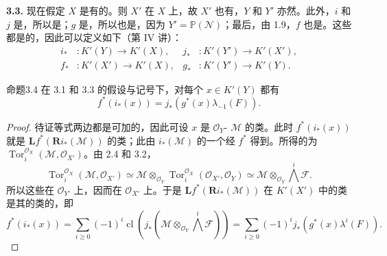 \textbf{3.3.} 现在假定 $X$ 是有的。则 $X'$ 在 $X$ 上，故 $X'$ 也有，$Y$ 和 $Y'$ 亦然。此外，$i$ 和 $j$ 是，所以是；$g$ 是，所以也是，因为 $Y'=\mathbb P(\mathcal N)$；最后，由 1.9，$f$ 也是。这些都是的，因此可以定义如下（第 IV 讲）：
\[
\begin{aligned}
i_* &:K'(Y)\longrightarrow K'(X),&j_* &:K'(Y')\longrightarrow K'(X'),\\
f_* &:K'(X')\longrightarrow K'(X),&g_* &:K'(Y')\longrightarrow K'(Y).
\end{aligned}
\]
\begin{SGAresult}{命题}{3.4}
在 3.1 和 3.3 的假设与记号下，对每个 $x\in K'(Y)$ 都有
\[
f^*(i_*(x))=j_*(g^*(x)\lambda_{-1}(F)).
\]
\end{SGAresult}
\begin{proof}
待证等式两边都是可加的，因此可设 $x$ 是 $\mathcal O_Y$- $\mathcal M$ 的类。此时 $f^*(i_*(x))$ 就是 $\mathbf Lf^*(\mathbf Ri_*(\mathcal M))$ 的类；此由 $i_*(\mathcal M)$ 的一个经 $f^*$ 得到。所得的为 $\operatorname{Tor}^{\mathcal O_X}_i(\mathcal M,\mathcal O_{X'})$。由 2.4 和 3.2，
\[
\operatorname{Tor}^{\mathcal O_X}_i(\mathcal M,\mathcal O_{X'})
\simeq\mathcal M\otimes_{\mathcal O_Y}\operatorname{Tor}^{\mathcal O_X}_i(\mathcal O_{X'},\mathcal O_Y)
\simeq\mathcal M\otimes_{\mathcal O_Y}\bigwedge^i\mathcal F.
\]
所以这些在 $\mathcal O_{Y'}$ 上，因而在 $\mathcal O_{X'}$ 上。于是 $\mathbf Lf^*(\mathbf Ri_*(\mathcal M))$ 在 $K'(X')$ 中的类是其的类的，即
\[
f^*(i_*(x))=\sum_{i\geq0}(-1)^i\operatorname{cl}\left(j_*\left(\mathcal M\otimes_{\mathcal O_Y}\bigwedge^i\mathcal F\right)\right)
=\sum_{i\geq0}(-1)^i j_*(g^*(x)\lambda^i(F)).
\]
\end{proof}

